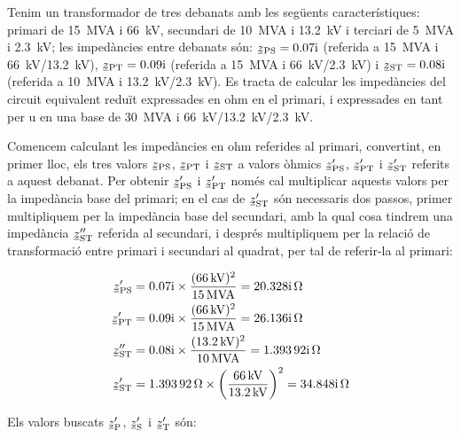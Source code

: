	
\begin{exemple}[\ImpCircEqTrafoTresDeb{}]
	\addcontentsxms{\ImpCircEqTrafoTresDeb}
    Tenim un transformador de tres debanats amb les següents característiques: primari de \qty{15}{MVA} i \qty{66}{kV}, secundari de \qty{10}{MVA} i \qty{13,2}{kV} i terciari de \qty{5}{MVA} i \qty{2,3}{kV}; les impedàncies entre debanats són: $\cmplx{z}\ped{PS} = \complexnum{j 0,07}$ (referida a \qty{15}{MVA} i \qty{66}{kV}/\qty{13,2}{kV}), $\cmplx{z}\ped{PT} = \complexnum{j 0,09}$ (referida a \qty{15}{MVA} i \qty{66}{kV}/\qty{2,3}{kV}) i $\cmplx{z}\ped{ST} = \complexnum{j 0,08}$ (referida a \qty{10}{MVA} i \qty{13,2}{kV}/\qty{2,3}{kV}).  Es tracta de calcular les impedàncies del circuit equivalent reduït expressades en ohm en el primari, i expressades en tant per u en una base de \qty{30}{MVA} i \qty{66}{kV}/\qty{13,2}{kV}/\qty{2,3}{kV}.

    Comencem calculant les impedàncies en ohm referides al primari, convertint, en primer lloc, els tres valors $\cmplx{z}\ped{PS}$, $\cmplx{z}\ped{PT}$ i $\cmplx{z}\ped{ST}$ a valors òhmics $\cmplx{z}\ped{PS}'$, $\cmplx{z}\ped{PT}'$ i $\cmplx{z}\ped{ST}'$ referits a aquest debanat. Per obtenir $\cmplx{z}\ped{PS}'$ i $\cmplx{z}\ped{PT}'$ només cal multiplicar aquests valors per la impedància base del primari; en el cas de $\cmplx{z}\ped{ST}'$ són necessaris dos passos, primer multipliquem per la impedància base del secundari, amb la qual cosa tindrem una impedància $\cmplx{z}\ped{ST}''$ referida al secundari,  i després multipliquem per la relació de transformació entre primari i secundari al quadrat, per tal de referir-la al primari:

    \begin{align*}
        \cmplx{z}\ped{PS}' &=  \complexnum{j 0,07} \times \frac{(\qty{66}{kV})^2}{\qty{15}{MVA}} = \complexqty{j 20,328}{\ohm}\\
        \cmplx{z}\ped{PT}' &=  \complexnum{j 0,09} \times \frac{(\qty{66}{kV})^2}{\qty{15}{MVA}} = \complexqty{j 26,136}{\ohm}\\
        \cmplx{z}\ped{ST}'' &= \complexnum{j 0,08} \times \frac{(\qty{13,2}{kV})^2}{\qty{10}{MVA}} = \complexqty{j 1,39392}{\ohm}\\
        \cmplx{z}\ped{ST}' &=  \qty{1,39392}{\ohm} \times {\left(\frac{\qty{66}{kV}}{\qty{13,2}{kV}}\right)}^2 = \complexqty{j 34,848}{\ohm}
    \end{align*}

    Els valors buscats $\cmplx{z}\ped{P}'$, $\cmplx{z}\ped{S}'$ i $\cmplx{z}\ped{T}'$ són:


\end{exemple}
